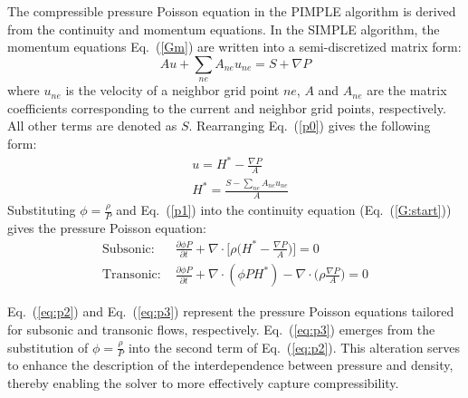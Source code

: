 The compressible pressure Poisson equation in the PIMPLE algorithm is derived from the continuity and momentum equations. In the SIMPLE algorithm, the momentum equations Eq.~(\ref{Gm}) are written into a semi-discretized matrix form:
\begin{equation}
    A u+ \sum_{ne} A_{ne} u_{ne} =S+\nabla P \label{p0}
\end{equation}
where $u_{ne}$ is the velocity of a neighbor grid point $ne$, $A$ and $A_{ne}$ are the matrix coefficients corresponding to the current and neighbor grid points, respectively. All other terms are denoted as $S$. Rearranging Eq.~(\ref{p0}) gives the following form:
\begin{align}
     & u=H^*-\frac{\nabla P}{A}\label{p1}       \\
     & H^* =\frac{S-\sum_{ne} A_{ne} u_{ne}}{A}
\end{align}
Substituting $\phi=\frac{\rho} {P}$ and Eq.~(\ref{p1}) into the continuity equation (Eq.~(\ref{G:start})) gives the pressure Poisson equation:
\begin{align}
    \text{Subsonic: }  & \frac{\partial\phi P}{\partial t}+\nabla\cdot \Bigg[\rho \bigg(H^*- \frac{\nabla P}{A}\bigg)\Bigg]=0 \label{eq:p2}         \\
    \text{Transonic: } & \frac{\partial\phi P}{\partial t}+\nabla\cdot (\phi P H^*)-\nabla\cdot \bigg(\rho \frac{\nabla P}{A}\bigg)=0 \label{eq:p3}
\end{align}

Eq.~(\ref{eq:p2}) and Eq.~(\ref{eq:p3}) represent the pressure Poisson equations tailored for subsonic and transonic flows, respectively. Eq.~(\ref{eq:p3}) emerges from the substitution of $\phi=\frac{\rho} {P}$ into the second term of Eq.~(\ref{eq:p2}). This alteration serves to enhance the description of the interdependence between pressure and density, thereby enabling the solver to more effectively capture compressibility.

